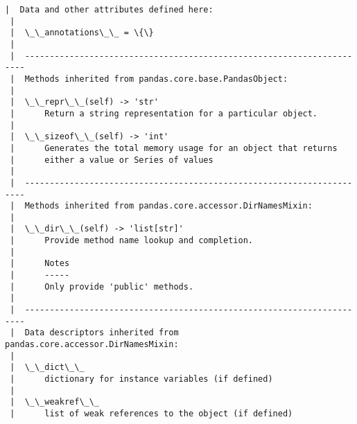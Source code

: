\documentclass[11pt]{article}
\begin{document}
\begin{Verbatim}[commandchars=\\\{\}]
 |  Data and other attributes defined here:
 |
 |  \_\_annotations\_\_ = \{\}
 |
 |  ----------------------------------------------------------------------
 |  Methods inherited from pandas.core.base.PandasObject:
 |
 |  \_\_repr\_\_(self) -> 'str'
 |      Return a string representation for a particular object.
 |
 |  \_\_sizeof\_\_(self) -> 'int'
 |      Generates the total memory usage for an object that returns
 |      either a value or Series of values
 |
 |  ----------------------------------------------------------------------
 |  Methods inherited from pandas.core.accessor.DirNamesMixin:
 |
 |  \_\_dir\_\_(self) -> 'list[str]'
 |      Provide method name lookup and completion.
 |
 |      Notes
 |      -----
 |      Only provide 'public' methods.
 |
 |  ----------------------------------------------------------------------
 |  Data descriptors inherited from pandas.core.accessor.DirNamesMixin:
 |
 |  \_\_dict\_\_
 |      dictionary for instance variables (if defined)
 |
 |  \_\_weakref\_\_
 |      list of weak references to the object (if defined)

    \end{Verbatim}


    
    
    
\end{document}
